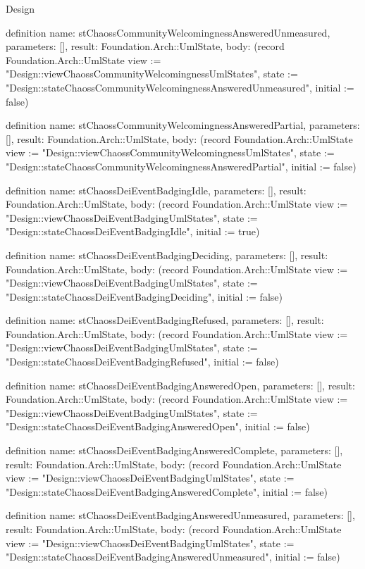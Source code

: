 \begin{lexlean}{Design}
\begin{semanticmodule}
definition{
  name: stChaossCommunityWelcomingnessAnsweredUnmeasured,
  parameters: [],
  result: Foundation.Arch::UmlState,
  body: (record Foundation.Arch::UmlState {view := "Design::viewChaossCommunityWelcomingnessUmlStates", state := "Design::stateChaossCommunityWelcomingnessAnsweredUnmeasured", initial := false})
}

definition{
  name: stChaossCommunityWelcomingnessAnsweredPartial,
  parameters: [],
  result: Foundation.Arch::UmlState,
  body: (record Foundation.Arch::UmlState {view := "Design::viewChaossCommunityWelcomingnessUmlStates", state := "Design::stateChaossCommunityWelcomingnessAnsweredPartial", initial := false})
}

definition{
  name: stChaossDeiEventBadgingIdle,
  parameters: [],
  result: Foundation.Arch::UmlState,
  body: (record Foundation.Arch::UmlState {view := "Design::viewChaossDeiEventBadgingUmlStates", state := "Design::stateChaossDeiEventBadgingIdle", initial := true})
}

definition{
  name: stChaossDeiEventBadgingDeciding,
  parameters: [],
  result: Foundation.Arch::UmlState,
  body: (record Foundation.Arch::UmlState {view := "Design::viewChaossDeiEventBadgingUmlStates", state := "Design::stateChaossDeiEventBadgingDeciding", initial := false})
}

definition{
  name: stChaossDeiEventBadgingRefused,
  parameters: [],
  result: Foundation.Arch::UmlState,
  body: (record Foundation.Arch::UmlState {view := "Design::viewChaossDeiEventBadgingUmlStates", state := "Design::stateChaossDeiEventBadgingRefused", initial := false})
}

definition{
  name: stChaossDeiEventBadgingAnsweredOpen,
  parameters: [],
  result: Foundation.Arch::UmlState,
  body: (record Foundation.Arch::UmlState {view := "Design::viewChaossDeiEventBadgingUmlStates", state := "Design::stateChaossDeiEventBadgingAnsweredOpen", initial := false})
}

definition{
  name: stChaossDeiEventBadgingAnsweredComplete,
  parameters: [],
  result: Foundation.Arch::UmlState,
  body: (record Foundation.Arch::UmlState {view := "Design::viewChaossDeiEventBadgingUmlStates", state := "Design::stateChaossDeiEventBadgingAnsweredComplete", initial := false})
}

definition{
  name: stChaossDeiEventBadgingAnsweredUnmeasured,
  parameters: [],
  result: Foundation.Arch::UmlState,
  body: (record Foundation.Arch::UmlState {view := "Design::viewChaossDeiEventBadgingUmlStates", state := "Design::stateChaossDeiEventBadgingAnsweredUnmeasured", initial := false})
}


\end{semanticmodule}
\end{lexlean}
